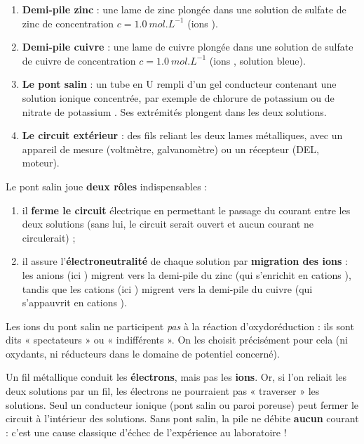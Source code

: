 \documentclass[11pt]{article}
\begin{document}
\begin{enumerate}
\item \textbf{Demi-pile zinc} : une lame de zinc plongée dans une solution de sulfate de zinc  de concentration $c = \SI{1,0}{mol.L^{-1}}$ (ions ).
\item \textbf{Demi-pile cuivre} : une lame de cuivre plongée dans une solution de sulfate de cuivre  de concentration $c = \SI{1,0}{mol.L^{-1}}$ (ions , solution bleue).
\item \textbf{Le pont salin} : un tube en U rempli d'un gel conducteur contenant une solution ionique concentrée, par exemple de chlorure de potassium  ou de nitrate de potassium . Ses extrémités plongent dans les deux solutions.
\item \textbf{Le circuit extérieur} : des fils reliant les deux lames métalliques, avec un appareil de mesure (voltmètre, galvanomètre) ou un récepteur (DEL, moteur).
\end{enumerate}

\begin{propriete}
Le pont salin joue \textbf{deux rôles} indispensables :
\begin{enumerate}
\item il \textbf{ferme le circuit} électrique en permettant le passage du courant entre les deux solutions (sans lui, le circuit serait ouvert et aucun courant ne circulerait) ;
\item il assure l'\textbf{électroneutralité} de chaque solution par \textbf{migration des ions} : les anions (ici ) migrent vers la demi-pile du zinc (qui s'enrichit en cations ), tandis que les cations (ici ) migrent vers la demi-pile du cuivre (qui s'appauvrit en cations ).
\end{enumerate}
Les ions du pont salin ne participent \emph{pas} à la réaction d'oxydoréduction : ils sont dits « spectateurs » ou « indifférents ». On les choisit précisément pour cela (ni oxydants, ni réducteurs dans le domaine de potentiel concerné).
\end{propriete}

\begin{attention}
Un fil métallique conduit les \textbf{électrons}, mais pas les \textbf{ions}. Or, si l'on reliait les deux solutions par un fil, les électrons ne pourraient pas « traverser » les solutions. Seul un conducteur ionique (pont salin ou paroi poreuse) peut fermer le circuit à l'intérieur des solutions. Sans pont salin, la pile ne débite \textbf{aucun} courant : c'est une cause classique d'échec de l'expérience au laboratoire !
\end{attention}
\end{document}
